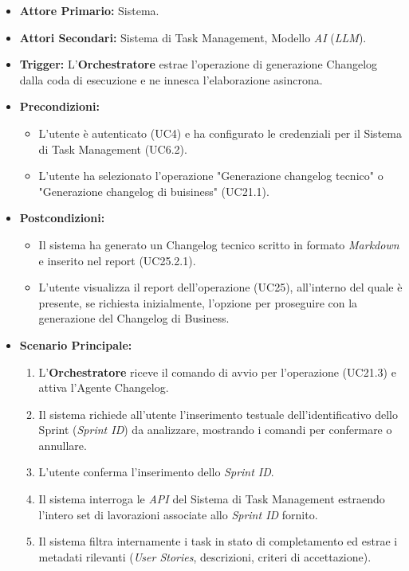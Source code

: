 \documentclass[12pt, a4paper]{article}
\begin{document}
\begin{itemize}
    \item \textbf{Attore Primario:} Sistema.
    \item \textbf{Attori Secondari:} Sistema di Task Management, Modello \textit{AI} (\textit{LLM}).
    \item \textbf{Trigger:} L'\textbf{Orchestratore} estrae l'operazione di generazione Changelog dalla coda di esecuzione e ne innesca l'elaborazione asincrona.
    \item \textbf{Precondizioni:}
    \begin{itemize}
        \item L'utente è autenticato (UC4) e ha configurato le credenziali per il Sistema di Task Management (UC6.2).
        \item L'utente ha selezionato l'operazione "Generazione changelog tecnico" o "Generazione changelog di buisiness" (UC21.1).
    \end{itemize}\newpage
    \item \textbf{Postcondizioni:}
    \begin{itemize}
        \item Il sistema ha generato un Changelog tecnico scritto in formato \textit{Markdown} e inserito nel report (UC25.2.1).
        \item L'utente visualizza il report dell'operazione (UC25), all'interno del quale è presente, se richiesta inizialmente, l'opzione per proseguire con la generazione del Changelog di Business.
    \end{itemize}
    \item \textbf{Scenario Principale:}
    \begin{enumerate}
        \item L'\textbf{Orchestratore} riceve il comando di avvio per l'operazione (UC21.3) e attiva l'Agente Changelog.
        \item Il sistema richiede all'utente l'inserimento testuale dell'identificativo dello Sprint (\textit{Sprint ID}) da analizzare, mostrando i comandi per confermare o annullare.
        \item L'utente conferma l'inserimento dello \textit{Sprint ID}.
        \item Il sistema interroga le \textit{API} del Sistema di Task Management estraendo l'intero set di lavorazioni associate allo \textit{Sprint ID} fornito.
        \item Il sistema filtra internamente i task in stato di completamento ed estrae i metadati rilevanti (\textit{User Stories}, descrizioni, criteri di accettazione).

\end{enumerate}
\end{itemize}
\end{document}
